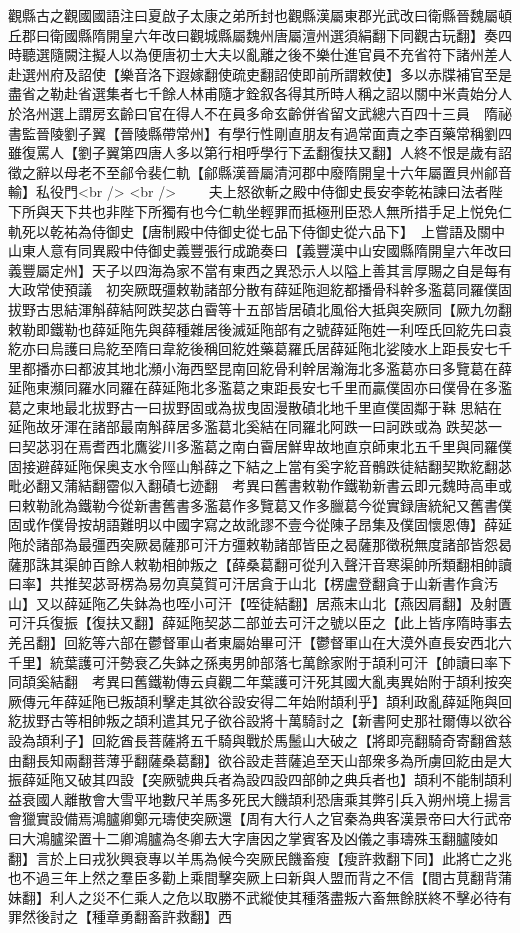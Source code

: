 觀縣古之觀國國語注曰夏啟子太康之弟所封也觀縣漢屬東郡光武改曰衛縣晉魏屬頓丘郡曰衛國縣隋開皇六年改曰觀城縣屬魏州唐屬澶州選須絹翻下同觀古玩翻】奏四時聽選隨闕注擬人以為便唐初士大夫以亂離之後不樂仕進官員不充省符下諸州差人赴選州府及詔使【樂音洛下遐嫁翻使疏吏翻詔使即前所謂敕使】多以赤牒補官至是盡省之勒赴省選集者七千餘人林甫隨才銓叙各得其所時人稱之詔以關中米貴始分人於洛州選上謂房玄齡曰官在得人不在員多命玄齡併省留文武總六百四十三員　隋祕書監晉陵劉子翼【晉陵縣帶常州】有學行性剛直朋友有過常面責之李百藥常稱劉四雖復罵人【劉子翼第四唐人多以第行相呼學行下孟翻復扶又翻】人終不恨是歲有詔徵之辭以母老不至鄃令裴仁軌【鄃縣漢晉屬清河郡中廢隋開皇十六年屬置貝州鄃音輸】私役門<br />
<br />
　　夫上怒欲斬之殿中侍御史長安李乾祐諫曰法者陛下所與天下共也非陛下所獨有也今仁軌坐輕罪而抵極刑臣恐人無所措手足上悦免仁軌死以乾祐為侍御史【唐制殿中侍御史從七品下侍御史從六品下】　上嘗語及關中山東人意有同異殿中侍御史義豐張行成跪奏曰【義豐漢中山安國縣隋開皇六年改曰義豐屬定州】天子以四海為家不當有東西之異恐示人以隘上善其言厚賜之自是每有大政常使預議　初突厥既彊敕勒諸部分散有薛延陁迴紇都播骨科幹多濫葛同羅僕固拔野古思結渾斛薛結阿跌契苾白霫等十五部皆居磧北風俗大抵與突厥同【厥九勿翻敕勒即鐵勒也薛延陁先與薛種雜居後滅延陁部有之號薛延陁姓一利咥氏回紇先曰袁紇亦曰烏護曰烏紇至隋曰韋紇後稱回紇姓藥葛羅氏居薛延陁北娑陵水上距長安七千里都播亦曰都波其地北瀕小海西堅昆南回紇骨利幹居瀚海北多濫葛亦曰多覽葛在薛延陁東瀕同羅水同羅在薛延陁北多濫葛之東距長安七千里而贏僕固亦曰僕骨在多濫葛之東地最北拔野古一曰拔野固或為拔曳固漫散磧北地千里直僕固鄰于靺思結在延陁故牙渾在諸部最南斛薛居多濫葛北奚結在同羅北阿跌一曰訶跌或為跌契苾一曰契苾羽在焉耆西北鷹娑川多濫葛之南白霫居鮮卑故地直京師東北五千里與同羅僕固接避薛延陁保奥支水令陘山斛薛之下結之上當有奚字紇音鶻跌徒結翻契欺紇翻苾毗必翻又蒲結翻霤似入翻磧七迹翻　考異曰舊書敕勒作鐵勒新書云即元魏時高車或曰敕勒訛為鐵勒今從新書舊書多濫葛作多覽葛又作多臘葛今從實録唐統紀又舊書僕固或作僕骨按胡語難明以中國字寫之故訛謬不壹今從陳子昂集及僕固懷恩傳】薛延陁於諸部為最彊西突厥曷薩那可汗方彊敕勒諸部皆臣之曷薩那徵税無度諸部皆怨曷薩那誅其渠帥百餘人敕勒相帥叛之【薛桑葛翻可從刋入聲汗音寒渠帥所類翻相帥讀曰率】共推契苾哥楞為易勿真莫賀可汗居貪于山北【楞盧登翻貪于山新書作貪汚山】又以薛延陁乙失鉢為也咥小可汗【咥徒結翻】居燕末山北【燕因肩翻】及射匱可汗兵復振【復扶又翻】薛延陁契苾二部並去可汗之號以臣之【此上皆序隋時事去羌呂翻】回紇等六部在鬱督軍山者東屬始畢可汗【鬱督軍山在大漠外直長安西北六千里】統葉護可汗勢衰乙失鉢之孫夷男帥部落七萬餘家附于頡利可汗【帥讀曰率下同頡奚結翻　考異曰舊鐵勒傳云貞觀二年葉護可汗死其國大亂夷異始附于頡利按突厥傳元年薛延陁已叛頡利擊走其欲谷設安得二年始附頡利乎】頡利政亂薛延陁與回紇拔野古等相帥叛之頡利遣其兄子欲谷設將十萬騎討之【新書阿史那社爾傳以欲谷設為頡利子】回紇酋長菩薩將五千騎與戰於馬鬛山大破之【將即亮翻騎奇寄翻酋慈由翻長知兩翻菩薄乎翻薩桑葛翻】欲谷設走菩薩追至天山部衆多為所虜回紇由是大振薛延陁又破其四設【突厥號典兵者為設四設四部帥之典兵者也】頡利不能制頡利益衰國人離散會大雪平地數尺羊馬多死民大饑頡利恐唐乘其弊引兵入朔州境上揚言會獵實設備焉鴻臚卿鄭元璹使突厥還【周有大行人之官秦為典客漢景帝曰大行武帝曰大鴻臚梁置十二卿鴻臚為冬卿去大字唐因之掌賓客及凶儀之事璹殊玉翻臚陵如翻】言於上曰戎狄興衰專以羊馬為候今突厥民饑畜瘦【瘦許救翻下同】此將亡之兆也不過三年上然之羣臣多勸上乘間擊突厥上曰新與人盟而背之不信【間古莧翻背蒲妹翻】利人之災不仁乘人之危以取勝不武縱使其種落盡叛六畜無餘朕終不擊必待有罪然後討之【種章勇翻畜許救翻】西